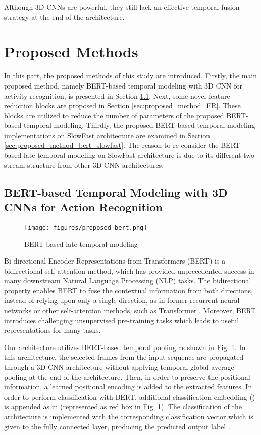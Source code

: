 \documentclass[runningheads]{llncs}
\begin{document}
Although 3D CNNs are powerful, they still lack an effective temporal fusion strategy at the end of the architecture. \section{Proposed Methods}
In this part, the proposed methods of this study are introduced. Firstly, the main proposed method, namely BERT-based temporal modeling with 3D CNN for activity recognition, is presented in Section \ref{sec:proposed_method_BERT}. Next, some novel feature reduction blocks are proposed in Section \ref{sec:proposed_method_FR}. These blocks are utilized to reduce the number of parameters of the proposed BERT-based temporal modeling. Thirdly, the proposed BERT-based temporal modeling implementations on SlowFast architecture are examined in Section \ref{sec:proposed_method_bert_slowfast}. The reason to re-consider the BERT-based late temporal modeling on SlowFast architecture is due to its different two-stream structure from other 3D CNN architectures.

\subsection{BERT-based Temporal Modeling with 3D CNNs for 
Action Recognition}
\label{sec:proposed_method_BERT}

\begin{figure}
\centering
\texttt{[image: figures/proposed\_bert.png]}
\caption{BERT-based late temporal modeling}\label{fig:bert}
\end{figure}

Bi-directional Encoder Representations from Transformers (BERT) \cite{Devlin2018} is a bidirectional self-attention method, which has provided unprecedented success in many downstream Natural Language Processing (NLP) tasks. The bidirectional property enables BERT to fuse the contextual information from both directions, instead of relying upon only a single direction, as in former recurrent neural networks or other self-attention methods, such as Transformer \cite{Vaswani2017}. Moreover, BERT introduces challenging unsupervised pre-training tasks which leads to useful representations for many tasks.

Our architecture utilizes BERT-based temporal pooling as shown in Fig. \ref{fig:bert}. In this architecture, the selected  frames from the input sequence are propagated through a 3D CNN architecture without applying temporal global average pooling at the end of the architecture. Then, in order to preserve the positional information, a learned positional encoding is added to the extracted features. In order to perform classification with BERT, additional classification  embedding () is appended as in \cite{Devlin2018} (represented as red box in Fig. \ref{fig:bert}). The classification of the architecture is implemented with the corresponding classification vector  which is given to the fully connected layer, producing the predicted output label . 
\end{document}
